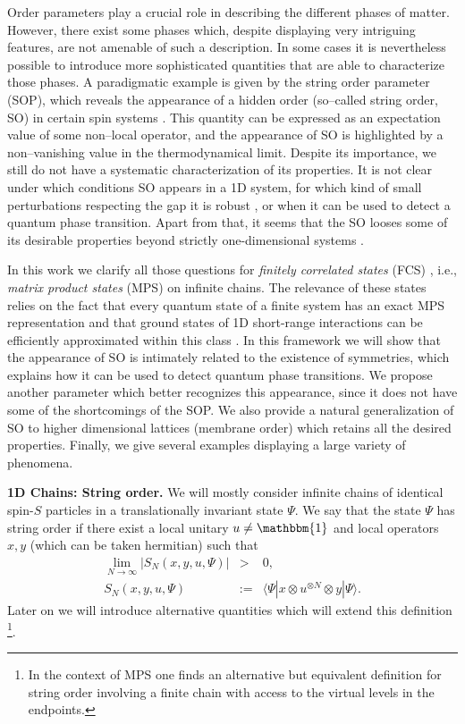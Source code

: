 \documentclass[prl,floatfix,showpacs,amsmat,twocolumn]{revtex4}
\newcommand{\bea}{\begin{eqnarray}}
\newcommand{\eea}{\end{eqnarray}}
\newcommand{\1}{\mathbbm{1}}
\renewcommand{\>}{\rangle}
\newcommand{\<}{\langle}
\newcommand{\vs}{\vspace*{4pt}}
\begin{document}
Order parameters play a crucial role in describing the different
phases of matter. However, there exist some phases which, despite
displaying very intriguing features, are not amenable of such a
description. In some cases it is nevertheless possible to
introduce more sophisticated quantities that are able to
characterize those phases. A paradigmatic example is given by the
string order parameter (SOP), which reveals the appearance of a
hidden order (so--called string order, SO) in certain spin systems
\cite{SOP-history-1,SOP-history-2,ladder}. This quantity can be
expressed as an expectation value of some non--local operator, and
the appearance of SO is highlighted by a non--vanishing value in
the thermodynamical limit. Despite its importance, we still do not
have a systematic characterization of its properties. It is not
clear under which conditions SO appears in a 1D  system, for which
kind of small perturbations respecting the gap it is robust
\cite{fragility}, or when it can be used to detect a quantum phase
transition. Apart from that, it seems that the SO looses some of
its desirable properties beyond strictly one-dimensional systems
\cite{ladder,fragility}.

In this work we clarify all those questions for \emph{finitely
    correlated states} (FCS) \cite{FaNaWe}, i.e., \emph{matrix product
    states} (MPS) \cite{MPS-mother} on infinite chains. The relevance
of these states relies on the fact that every quantum state of a
finite system has an exact MPS representation
\cite{MPS-mother,Vidal} and that ground states of 1D short-range
interactions can be efficiently approximated within this class
\cite{approx}. In this framework we will show that the appearance
of SO is intimately related to the existence of symmetries, which
explains how it can be used to detect quantum phase transitions.
We propose another parameter which better recognizes this
appearance, since it does not have some of the shortcomings of the
SOP. We also provide a natural generalization of SO to  higher
dimensional lattices (membrane order) which retains all the
desired properties. Finally, we give several examples displaying a
large variety of phenomena. \vs

\textbf{1D Chains: String order.} We will mostly consider infinite
chains of identical spin-$S$ particles in a translationally invariant
state $\Psi$. We say that the state $\Psi$ has string order if
there exist a local unitary $u\ne \1$ and local operators $x,y$
(which can be taken hermitian) such that
\bea
    \lim_{N\to\infty} |S_N(x,y,u,\Psi)|&>&0,\\
    \label{SOP}
    S_N(x,y,u,\Psi)&:=&\langle\Psi|
    x\otimes u^{\otimes N} \otimes y |\Psi\rangle.
\eea
Later on we will introduce alternative quantities which will
extend this definition \footnote{In the context of MPS one finds
    an alternative but equivalent definition for string order
    \cite{Martin-Delgado} involving a finite chain with access to the
    virtual levels in the endpoints. }.
\end{document}
